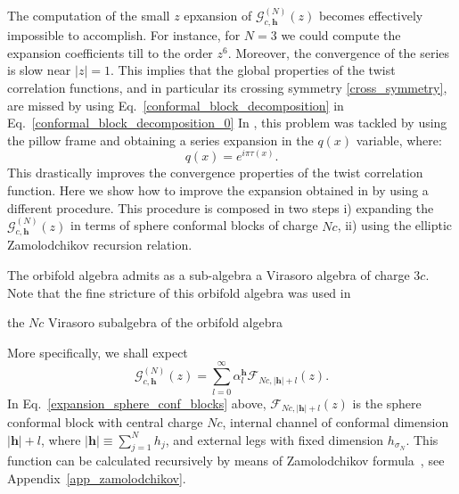 \documentclass[a4paper,11pt]{article}
\begin{document}
The computation of the small $z$ epxansion of $\mathcal{G}_{c,\boldsymbol{h}}^{(N)}(z)$ becomes effectively impossible to accomplish. For instance, for $N=3$ we could compute the expansion coefficients till to the order  $z^6$. Moreover, the convergence of the series is slow near $|z|=1$.  This implies that the global properties of the twist correlation functions, and in particular its crossing symmetry \eqref{cross_symmetry}, are missed by using Eq.~\eqref{conformal_block_decomposition} in Eq.~\eqref{conformal_block_decomposition_0} 
In \cite{Collier}, this problem was tackled by using the pillow frame and obtaining a series expansion in the $q(x)$ variable, where:
\begin{equation}
\label{defq}
q(x)= e^{i \pi \tau(x)}.
\end{equation} 
This drastically improves the convergence properties of the twist correlation function.  Here we show how to improve the expansion obtained in \cite{Collier} by using a different procedure. This procedure is composed in two steps i) expanding the  $\mathcal{G}_{c,\boldsymbol{h}}^{(N)}(z)$ in terms of sphere conformal blocks of charge $N c$, ii) using the elliptic Zamolodchikov recursion relation. 
 
The orbifold algebra admits as a sub-algebra a Virasoro algebra of charge $3 c$\cite{Borisov}. Note that the fine stricture of this orbifold algebra was used in \cite{Dupic}  

 the $N c$ Virasoro subalgebra of the orbifold algebra \cite{Borisov} 

  More specifically, we shall expect
\begin{equation}\label{expansion_sphere_conf_blocks}
 \mathcal{G}_{c, \boldsymbol{h}}^{(N)}(z)=\sum_{l=0}^{\infty}\alpha_{l}^{\boldsymbol{h}}
 \mathcal{F}_{Nc, |\boldsymbol{h}|+l}(z).
\end{equation}
In Eq.~\eqref{expansion_sphere_conf_blocks} above,  $\mathcal{F}_{Nc, |\boldsymbol{h}|+l}(z)$ is the sphere conformal block 
with central charge $Nc$, internal channel of conformal dimension $|\boldsymbol{h}|+l$, where $|\boldsymbol{h}|\equiv \sum_{j=1}^N h_j$, and external legs with fixed dimension 
$h_{\sigma_N}$. This function can be calculated
recursively by means of Zamolodchikov formula~\cite{Zamolodchikov2, Zamolodchikov}, see Appendix~\ref{app_zamolodchikov}.
\end{document}
